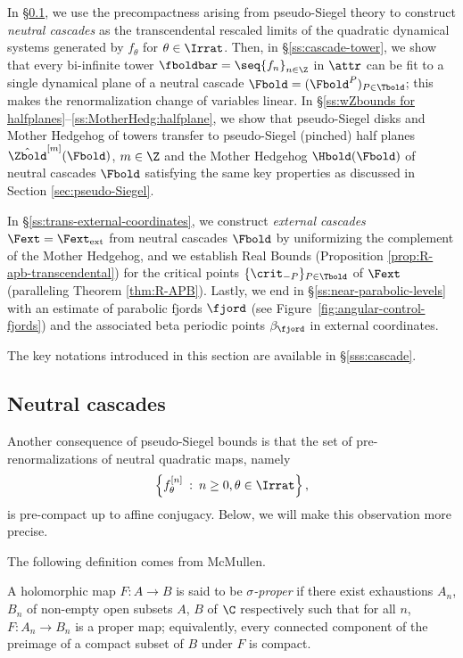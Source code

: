 \documentclass{amsart}
\begin{document}
In \S\ref{ss:neutral-cascade}, we use the precompactness arising from pseudo-Siegel theory to construct \emph{neutral cascades} as the transcendental rescaled limits of the quadratic dynamical systems generated by $f_\theta$ for $\theta \in \Irrat$.
Then, in \S\ref{ss:cascade-tower}, we show that every bi-infinite tower $\fboldbar = \seq{ f_n }_{n \in \Z}$ in $\attr$ can be fit to a single dynamical plane of a neutral cascade $\Fbold = (\Fbold^P)_{P \in \Tbold}$; this makes the renormalization change of variables linear.
In \S\ref{ss:wZbounds for halfplanes}--\ref{ss:MotherHedg:halfplane}, we show that pseudo-Siegel disks and Mother Hedgehog of towers transfer to pseudo-Siegel (pinched) half planes $\hat{\Zbold}^{[m]}(\Fbold)$, $m\in\Z$ and the Mother Hedgehog $\Hbold(\Fbold)$ of neutral cascades $\Fbold$ satisfying the same key properties as discussed in Section \ref{sec:pseudo-Siegel}.



In \S\ref{ss:trans-external-coordinates}, we construct \emph{external cascades} $\Fext = \Fext_{\textnormal{ext}}$ from neutral cascades $\Fbold$ by uniformizing the complement of the Mother Hedgehog, and we establish Real Bounds (Proposition \ref{prop:R-apb-transcendental}) for the critical points $\{\crit_{-P}\}_{P \in \Tbold}$ of $\Fext$ (paralleling Theorem \ref{thm:R-APB}).
Lastly, we end in \S\ref{ss:near-parabolic-levels} with an estimate of parabolic fjords $\fjord$ (see Figure~\ref{fig:angular-control-fjords}) and the associated beta periodic points $\beta_{\fjord}$ in external coordinates.

The key notations introduced in this section are available in \S\ref{sss:cascade}.

\subsection{Neutral cascades}
\label{ss:neutral-cascade}

Another consequence of pseudo-Siegel bounds is that 
the set of pre-renormalizations of neutral quadratic maps, namely 
    \[
    \left\{ f^{[n]}_\theta \: : \: n \geq 0, \theta \in \Irrat \right\},
    \]
is pre-compact up to affine conjugacy. 
Below, we will make this observation more precise.

The following definition comes from McMullen.

\begin{definition}
\label{defn:sigma-proper}
    A holomorphic map $F: A \to B$ is said to be \emph{$\sigma$-proper} if there exist exhaustions $A_n$, $B_n$ of non-empty open subsets $A$, $B$ of $\C$ respectively such that for all $n$, $F : A_n \to B_n$ is a proper map; equivalently, every connected component of the preimage of a compact subset of $B$ under $F$ is compact.
\end{definition}
\end{document}
